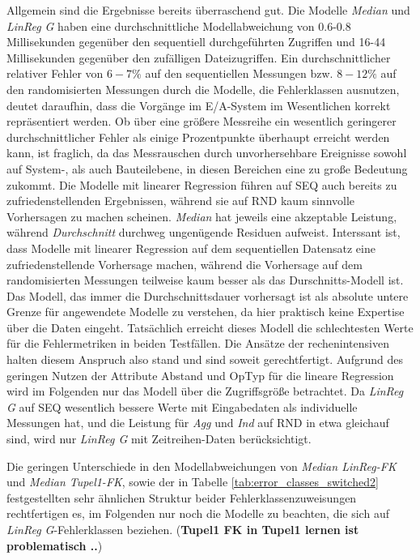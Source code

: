 \documentclass[
	12pt,
	a4paper,
	BCOR10mm,
	DIV14,
	listof=totoc,
	bibliography=totoc,
	headsepline
]{scrreprt}
\begin{document}
Allgemein sind die Ergebnisse bereits überraschend gut.
Die Modelle \textit{Median} und \textit{LinReg G} haben eine durchschnittliche Modellabweichung von 0.6-0.8 Millisekunden gegenüber den sequentiell durchgeführten Zugriffen und 16-44 Millisekunden gegenüber den zufälligen Dateizugriffen.
Ein durchschnittlicher relativer Fehler von $6-7\%$ auf den sequentiellen Messungen bzw. $8-12\%$ auf den randomisierten Messungen durch die Modelle, die Fehlerklassen ausnutzen, deutet daraufhin, dass die Vorgänge im E/A-System im Wesentlichen korrekt repräsentiert werden.
Ob über eine größere Messreihe ein wesentlich geringerer durchschnittlicher Fehler als einige Prozentpunkte überhaupt erreicht werden kann, ist fraglich, da das Messrauschen durch unvorhersehbare Ereignisse sowohl auf System-, als auch Bauteilebene, in diesen Bereichen eine zu große Bedeutung zukommt.
Die Modelle mit linearer Regression führen auf SEQ auch bereits zu zufriedenstellenden Ergebnissen, während sie auf RND kaum sinnvolle Vorhersagen zu machen scheinen.
\textit{Median} hat jeweils eine akzeptable Leistung, während \textit{Durchschnitt} durchweg ungenügende Residuen aufweist.
Interssant ist, dass Modelle mit linearer Regression auf dem sequentiellen Datensatz eine zufriedenstellende Vorhersage machen, während die Vorhersage auf dem randomisierten Messungen teilweise kaum besser als das Durschnitts-Modell ist. 
Das Modell, das immer die Durchschnittsdauer vorhersagt ist als absolute untere Grenze für angewendete Modelle zu verstehen, da hier praktisch keine Expertise über die Daten eingeht. 
Tatsächlich erreicht dieses Modell die schlechtesten Werte für die Fehlermetriken in beiden Testfällen. Die Ansätze der rechenintensiven halten diesem Anspruch also stand und sind soweit gerechtfertigt.
Aufgrund des geringen Nutzen der Attribute Abstand und OpTyp für die lineare Regression wird im Folgenden nur das Modell über die Zugriffsgröße betrachtet.
Da \textit{LinReg G} auf SEQ wesentlich bessere Werte mit Eingabedaten als individuelle Messungen hat, und die Leistung für \textit{Agg} und \textit{Ind} auf RND in etwa gleichauf sind, wird nur \textit{LinReg G} mit Zeitreihen-Daten berücksichtigt.

Die geringen Unterschiede in den Modellabweichungen von \textit{Median LinReg-FK} und \textit{Median Tupel1-FK}, sowie der in Tabelle \ref{tab:error_classes_switched2} festgestellten sehr ähnlichen Struktur beider Fehlerklassenzuweisungen rechtfertigen es, im Folgenden nur noch die Modelle zu beachten, die sich auf \textit{LinReg G}-Fehlerklassen beziehen.
(\textbf{Tupel1 FK in Tupel1 lernen ist problematisch ..})
\end{document}
